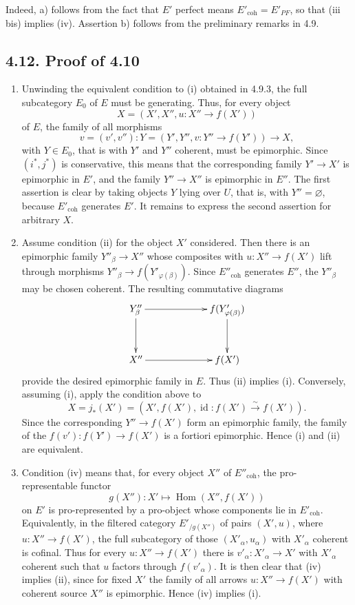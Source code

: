 \documentclass[11pt]{article}
\newcommand{\Hom}{\operatorname{Hom}}
\newcommand{\id}{\operatorname{id}}
\newcommand{\coh}{\mathrm{coh}}
\begin{document}
Indeed, a) follows from the fact that \(E'\) perfect means \(E'_{\coh}=E'_{PF}\), so that (iii bis) implies (iv). Assertion b) follows from the preliminary remarks in 4.9.

\subsection*{4.12. Proof of 4.10}
\begin{enumerate}[label=\alph*)]
\item Unwinding the equivalent condition to (i) obtained in 4.9.3, the full subcategory \(E_0\) of \(E\) must be generating. Thus, for every object
\[
 X=(X',X'',u:X''\to f(X'))
\]
of \(E\), the family of all morphisms
\[
 v=(v',v''):Y=(Y',Y'',v:Y''\to f(Y'))\to X,
\]
with \(Y\in E_0\), that is with \(Y'\) and \(Y''\) coherent, must be epimorphic. Since \((i^*,j^*)\) is conservative, this means that the corresponding family \(Y'\to X'\) is epimorphic in \(E'\), and the family \(Y''\to X''\) is epimorphic in \(E''\). The first assertion is clear by taking objects \(Y\) lying over \(U\), that is, with \(Y''=\varnothing\), because \(E'_{\coh}\) generates \(E'\). It remains to express the second assertion for arbitrary \(X\).

\item Assume condition (ii) for the object \(X'\) considered. Then there is an epimorphic family \(Y''_\beta\to X''\) whose composites with \(u:X''\to f(X')\) lift through morphisms \(Y''_\beta\to f(Y'_{\varphi(\beta)})\). Since \(E''_{\coh}\) generates \(E''\), the \(Y''_\beta\) may be chosen coherent. The resulting commutative diagrams
\[
\xymatrix@C=2.25cm@R=1.25cm{
Y''_\beta\ar[r]\ar[d]&f(Y'_{\varphi(\beta)})\ar[d]\\
X''\ar[r]&f(X')
}
\]
provide the desired epimorphic family in \(E\). Thus (ii) implies (i). Conversely, assuming (i), apply the condition above to
\[
 X=j_*(X')=(X',f(X'),\id:f(X')\xrightarrow{\sim}f(X')).
\]
Since the corresponding \(Y''\to f(X')\) form an epimorphic family, the family of the \(f(v'):f(Y')\to f(X')\) is a fortiori epimorphic. Hence (i) and (ii) are equivalent.

\item Condition (iv) means that, for every object \(X''\) of \(E''_{\coh}\), the pro-representable functor
\[
  g(X''):X'\longmapsto \Hom(X'',f(X'))
\]
on \(E'\) is pro-represented by a pro-object whose components lie in \(E'_{\coh}\). Equivalently, in the filtered category \(E'_{/g(X'')}\) of pairs \((X',u)\), where \(u:X''\to f(X')\), the full subcategory of those \((X'_\alpha,u_\alpha)\) with \(X'_\alpha\) coherent is cofinal. Thus for every \(u:X''\to f(X')\) there is \(v'_\alpha:X'_\alpha\to X'\) with \(X'_\alpha\) coherent such that \(u\) factors through \(f(v'_\alpha)\). It is then clear that (iv) implies (ii), since for fixed \(X'\) the family of all arrows \(u:X''\to f(X')\) with coherent source \(X''\) is epimorphic. Hence (iv) implies (i).


\end{enumerate}
\end{document}
